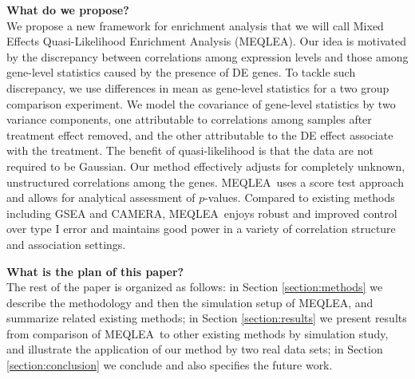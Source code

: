 \documentclass[a4,center,fleqn]{NAR}
\newcommand{\OurMethod}{MEQLEA}
\begin{document}
	\textbf{What do we propose?} \\
	We propose a new framework for enrichment analysis that we will call Mixed Effects Quasi-Likelihood
	Enrichment Analysis (\OurMethod). Our idea is motivated by the discrepancy between correlations
	among expression levels and those among gene-level statistics caused by the presence of DE genes.
	To tackle such discrepancy, we use differences in mean as gene-level statistics for a two group
	comparison experiment. We model the covariance of gene-level statistics by two variance components,
	one attributable to correlations among samples after treatment effect removed, and the other
	attributable to the DE effect associate with the treatment. The benefit of quasi-likelihood is that
	the data are not required to be Gaussian. Our method effectively adjusts for completely unknown,
	unstructured correlations among the genes. \OurMethod~uses a score test approach and allows for
	analytical assessment of $p$-values. Compared to existing methods including GSEA and CAMERA,
	\OurMethod~enjoys robust and improved control over type I error and maintains good power in a
	variety of correlation structure and association settings. 
	
	\textbf{What is the plan of this paper?} \\
	The rest of the paper is organized as follows: in Section \ref{section:methods} we describe the
	methodology and then the simulation setup of \OurMethod, and summarize related existing methods; in
	Section \ref{section:results} we present results from comparison of \OurMethod~to other existing
	methods by simulation study, and illustrate the application of our method by two real data sets; in
	Section \ref{section:conclusion} we conclude and also specifies the future work.
	
	
	
\end{document}
